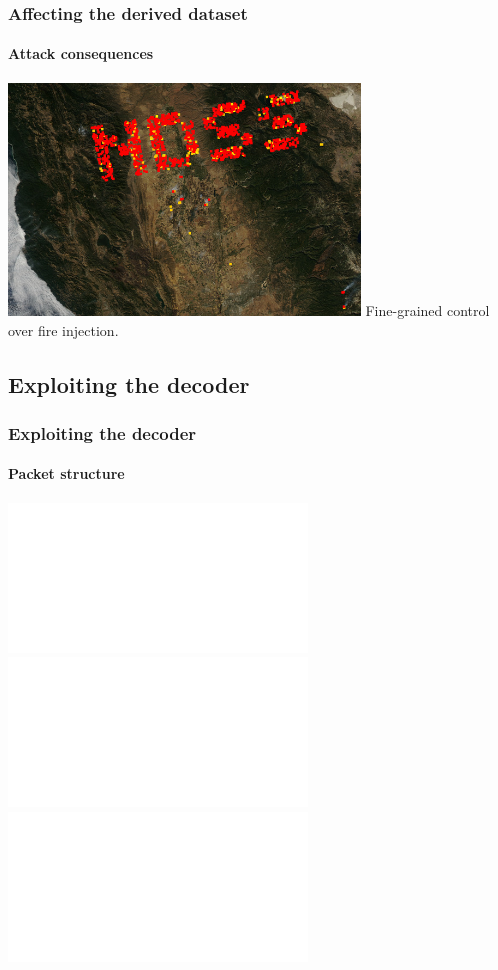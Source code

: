 \documentclass[aspectratio=169]{beamer}
\begin{document}
\begin{frame}
  \frametitle{Affecting the derived dataset}
  \framesubtitle{Attack consequences}
  \includegraphics[width=0.7\textwidth]{images/injection/pixels_800_140.jpg}
  \newline
  \centering
  Fine-grained control over fire injection.
\end{frame}

\subsection{Exploiting the decoder}

\begin{frame}
  \frametitle{Exploiting the decoder}
  \framesubtitle{Packet structure}
  \includegraphics<1|handout:0>[width=\textwidth]{images/packet_data_1.pdf}%
  \includegraphics<2|handout:0>[width=\textwidth]{images/packet_data_2.pdf}%
  \includegraphics<3->[width=\textwidth]{images/packet_data_3.pdf}%
\end{frame}
\end{document}
